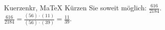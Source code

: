 \begin{MAufgabe}{Kuerzen}{kr, MaTeX}
K\"urzen Sie soweit m\"oglich: $\frac{616}{2184}$.\\ 
\ifLsg\MLoesung
\quad $\frac{616}{2184}=\frac{(56)\cdot(11)}{(56)\cdot(39)}=\frac{11}{39}$.\else\relax\fi
 \end{MAufgabe}